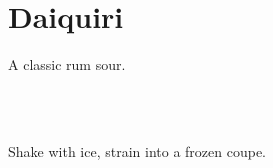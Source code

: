 \section[Daiquiri]{Daiquiri}

\begin{recipestats}[
        servings=1,
        preptime=5~\minute,
        original=\citefield{cocktailSeminars2021}{title}~\cite{cocktailSeminars2021},
    ]
\end{recipestats}

\begin{recipeabstract}
    A classic rum sour.
\end{recipeabstract}

\begin{ingredientcolumns}[1]
    \begin{ingredientblock}
        \\
        \\
    \end{ingredientblock}
\end{ingredientcolumns}

\begin{preparation}
\item Shake with ice, strain into a frozen coupe.
\end{preparation}

\recipeend%
